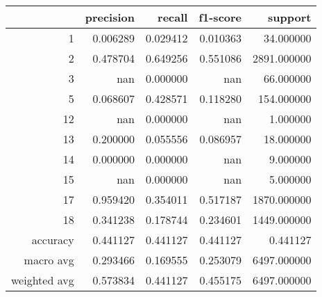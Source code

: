 \begin{tabular}{rrrrr}
\toprule
 & precision & recall & f1-score & support \\
\midrule
1 & 0.006289 & 0.029412 & 0.010363 & 34.000000 \\
2 & 0.478704 & 0.649256 & 0.551086 & 2891.000000 \\
3 & nan & 0.000000 & nan & 66.000000 \\
5 & 0.068607 & 0.428571 & 0.118280 & 154.000000 \\
12 & nan & 0.000000 & nan & 1.000000 \\
13 & 0.200000 & 0.055556 & 0.086957 & 18.000000 \\
14 & 0.000000 & 0.000000 & nan & 9.000000 \\
15 & nan & 0.000000 & nan & 5.000000 \\
17 & 0.959420 & 0.354011 & 0.517187 & 1870.000000 \\
18 & 0.341238 & 0.178744 & 0.234601 & 1449.000000 \\
accuracy & 0.441127 & 0.441127 & 0.441127 & 0.441127 \\
macro avg & 0.293466 & 0.169555 & 0.253079 & 6497.000000 \\
weighted avg & 0.573834 & 0.441127 & 0.455175 & 6497.000000 \\
\bottomrule
\end{tabular}
